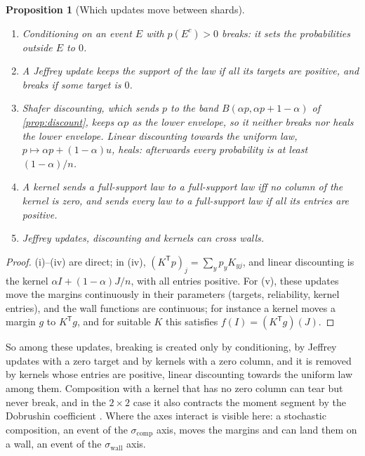 \documentclass[11pt]{article}
\newtheorem{proposition}[theorem]{Proposition}
\theoremstyle{definition}
\theoremstyle{remark}
\newcommand{\T}{\mathsf T}
\begin{document}
\begin{proposition}[Which updates move between shards]\label{prop:updateregimes}
\begin{enumerate}[label=(\roman*)]
\item Conditioning on an event $E$ with $p(E^c)>0$ breaks: it sets the probabilities outside $E$ to $0$.
\item A Jeffrey update keeps the support of the law if all its targets are positive, and breaks if some target is $0$.
\item Shafer discounting, which sends $p$ to the band $B(\alpha p,\alpha p+1-\alpha)$ of \cref{prop:discount}, keeps $\alpha p$ as the lower
  envelope, so it neither breaks nor heals the lower envelope. Linear discounting towards the uniform law, $p\mapsto\alpha p+(1-\alpha)u$, heals:
  afterwards every probability is at least $(1-\alpha)/n$.
\item A kernel sends a full-support law to a full-support law iff no column of the kernel is zero, and sends every law to a full-support
  law if all its entries are positive.
\item Jeffrey updates, discounting and kernels can cross walls.
\end{enumerate}
\end{proposition}
\begin{proof}
(i)--(iv) are direct; in (iv), $(K^\T p)_j=\sum_yp_yK_{yj}$, and linear discounting is the kernel $\alpha I+(1-\alpha)J/n$, with all entries
positive. For (v), these updates move the margins continuously in their parameters (targets, reliability, kernel entries), and the wall
functions are continuous; for instance a kernel moves a margin $g$ to $K^\T g$, and for suitable $K$ this satisfies $f(I)=(K^\T g)(J)$.
\end{proof}

So among these updates, breaking is created only by conditioning, by Jeffrey updates with a zero target and by kernels with a zero
column, and it is removed by kernels whose entries are positive, linear discounting towards the uniform law among them. Composition
with a kernel that has no zero column can tear but never break, and in the $2\times2$ case it also contracts the moment segment by the
Dobrushin coefficient \cite[Ex.~5.2]{Bridges}. Where the axes interact is visible here: a stochastic composition, an event of the
$\sigma_{\mathrm{comp}}$ axis, moves the margins and can land them on a wall, an event of the $\sigma_{\mathrm{wall}}$ axis.

\end{document}
